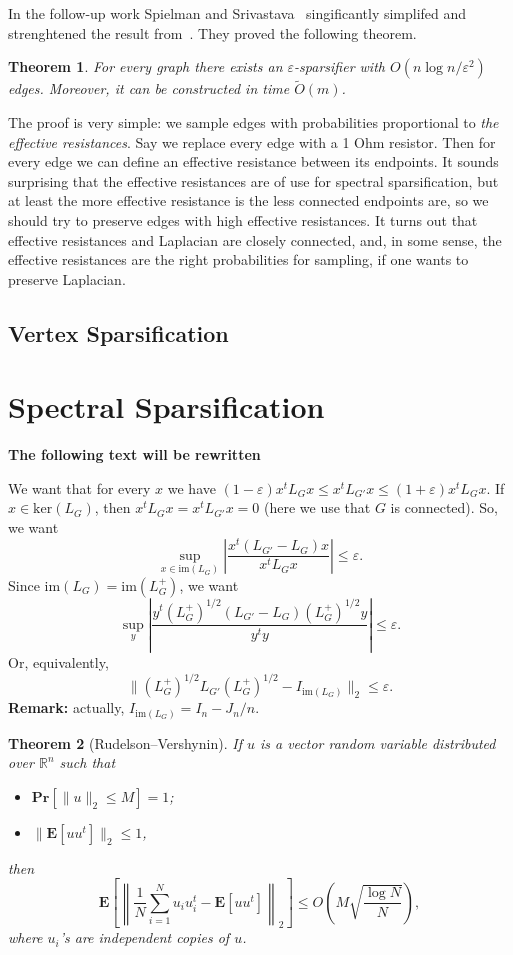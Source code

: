 \documentclass[12pt]{article}
\newcommand{\eps}{\varepsilon}
\newtheorem{theorem}{Theorem}
\begin{document}
    In the follow-up work Spielman and Srivastava~\cite{SS11} singificantly simplifed
    and strenghtened the result from~\cite{ST11}.
    They proved the following theorem.
    \begin{theorem}
        For every graph there exists an $\eps$-sparsifier with $O(n \log n / \eps^2)$
        edges. Moreover, it can be constructed in time $\tilde{O}(m)$.
    \end{theorem}
    The proof is very simple: we sample edges with probabilities proportional to
    \emph{the effective resistances}. Say we replace every edge with a 1 Ohm resistor.
    Then for every edge we can define an effective resistance between its endpoints.
    It sounds surprising that the effective resistances are of use for spectral
    sparsification, but at least the more effective resistance is the less connected
    endpoints are, so we should try to preserve edges with high effective resistances.
    It turns out that effective resistances and Laplacian are closely connected, and,
    in some sense, the effective resistances are the right probabilities for sampling,
    if one wants to preserve Laplacian.
    \subsection{Vertex Sparsification}
    \section{Spectral Sparsification}
    \textbf{The following text will be rewritten}

    We want that for every $x$ we have $(1 - \eps) x^t L_G x \leq x^t L_{G'} x \leq (1 + \eps) x^t L_G x$.
    If $x \in \mathrm{ker}(L_G)$, then $x^t L_G x = x^t L_{G'} x = 0$ (here we use that $G$ is connected).
    So, we want
    $$
        \sup_{x \in \mathrm{im}(L_G)} \left|\frac{x^t (L_{G'} - L_G) x}{x^t L_G x} \right| \leq \eps.
    $$
    Since $\mathrm{im}(L_G) = \mathrm{im}(L_G^+)$, we want
    $$
        \sup_{y} \left|\frac{y^t (L_G^+)^{1/2} (L_{G'} - L_G) (L_G^+)^{1/2} y}{y^t y}\right| \leq \eps.
    $$
    Or, equivalently,
    $$
        \|(L_G^+)^{1/2} L_{G'} (L_G^+)^{1/2} - I_{\mathrm{im}(L_G)}\|_2 \leq \eps.
    $$
    \textbf{Remark:} actually, $I_{\mathrm{im}(L_G)} = I_n - J_n / n$.

    \begin{theorem}[Rudelson--Vershynin]
        If $u$ is a vector random variable distributed over $\mathbb{R}^n$ such that
        \begin{itemize}
            \item $\mathbf{Pr}[\|u\|_2 \leq M] = 1$;
            \item $\|\mathbf{E}[uu^t]\|_2 \leq 1$,
        \end{itemize}
        then
        $$
            \mathbf{E}\left[\left\|\frac{1}{N} \sum_{i=1}^N u_i u_i^t -
            \mathbf{E}[uu^t]\right\|_2\right] \leq O\left(M \sqrt{\frac{\log N}{N}}\right),
        $$
        where $u_i$'s are independent copies of $u$.
    \end{theorem}
\end{document}

